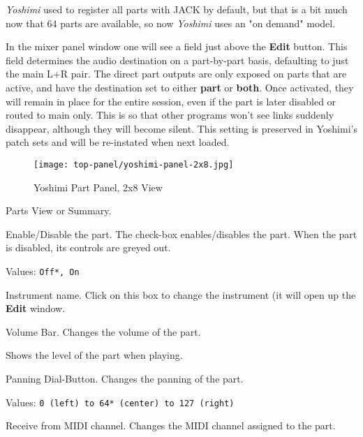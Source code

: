    \textsl{Yoshimi} used to register all parts with JACK by default, but that
   is a bit much now that 64 parts are available, so now \textsl{Yoshimi}
   uses an "on demand" model.

   In the mixer panel window one will see a field just above the
   \textbf{Edit} button.
   This field determines the audio destination on a part-by-part basis,
   defaulting to just the main L+R pair. The direct part outputs are only
   exposed on parts that are active, and have the destination set to either
   \textbf{part} or \textbf{both}.
   Once activated, they will remain in place for the entire session, even if
   the part is later disabled or routed to main only. This is so that other
   programs won't see links suddenly disappear, although they will become
   silent.  This setting is preserved in Yoshimi's patch sets and will be
   re-instated when next loaded.

\begin{figure}[H]
   \centering 
   \texttt{[image: top-panel/yoshimi-panel-2x8.jpg]}
   \caption[Yoshimi Part Panel]{Yoshimi Part Panel, 2x8 View}
   \label{fig:yoshimi_part_panel_2x8}
\end{figure}

   \setcounter{ItemCounter}{0}      %

   Parts View or Summary.

   Enable/Disable the part. The check-box enables/disables the part.
   When the part is disabled, its controls are greyed out.

   Values: \texttt{Off*, On}

   Instrument name. Click on this box to change the instrument (it will
   open up the \textbf{Edit} window.

   Volume Bar.
   Changes the volume of the part.

   Shows the level of the part when playing.

   Panning Dial-Button.
   Changes the panning of the part.

   Values: \texttt{0 (left) to 64* (center) to 127 (right)}

   Receive from MIDI channel.
   Changes the MIDI channel assigned to the part.

